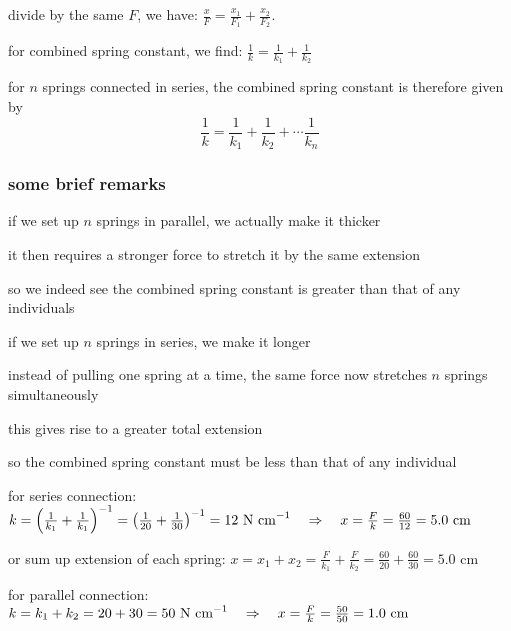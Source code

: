 divide by the same $F$, we have: $\frac{x}{F} = \frac{x_1}{F_1} + \frac{x_2}{F_2}$.

for combined spring constant, we find: $\frac{1}{k} = \frac{1}{k_1} + \frac{1}{k_2}$

for $n$ springs connected in series, the combined spring constant is therefore given by
\begin{equation*}
\boxed{\frac{1}{k} = \frac{1}{k_1} + \frac{1}{k_2} + \cdots \frac{1}{k_n}}
\end{equation*}

\subsubsection*{some brief remarks}

\cmt if we set up $n$ springs in parallel, we actually make it thicker

it then requires a stronger force to stretch it by the same extension

so we indeed see the combined spring constant is greater than that of any individuals

\cmt if we set up $n$ springs in series, we make it longer

instead of pulling one spring at a time, the same force now stretches $n$ springs simultaneously

this gives rise to a greater total extension

so the combined spring constant must be less than that of any individual


\sol for series connection: $k = \left(\frac{1}{k_1} + \frac{1}{k_1}\right)^{-1} = \left( \frac{1}{20} + \frac{1}{30} \right)^{-1} = 12 \text{ N cm}^{-1} \quad \Rightarrow \quad x = \frac{F}{k} = \frac{60}{12} = 5.0 \text{ cm}$

\eqskip or sum up extension of each spring: $x = x_1 + x_2 = \frac{F}{k_1} + \frac{F}{k_2} = \frac{60}{20} + \frac{60}{30} = 5.0 \text{ cm}$

for parallel connection: $k = k_1 + k_2 = 20 + 30 = 50 \text{ N cm}^{-1} \quad \Rightarrow \quad x = \frac{F}{k} = \frac{50}{50} = 1.0 \text{ cm} $ \eoe


